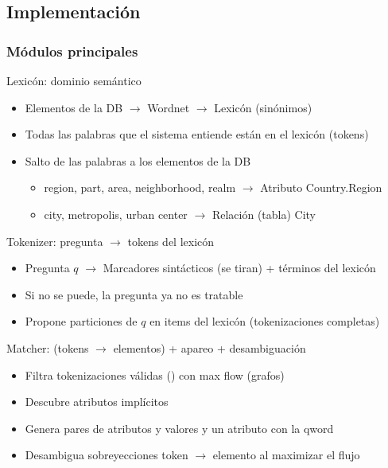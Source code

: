 \subsection{Implementación}


\begin{frame}[<+->]\fontsize{7.5pt}{7.2}\selectfont
  \frametitle{Módulos principales}
  \begin{block}{Lexicón: dominio semántico}
    \begin{itemize}
      \item Elementos de la DB $\rightarrow$ Wordnet $\rightarrow$ Lexicón (sinónimos)
      \item Todas las palabras que el sistema entiende están en el lexicón (tokens)
      \item Salto de las palabras a los elementos de la DB
      \begin{itemize}
        \item  \tiny{region, part, area, neighborhood, realm  $\rightarrow$ Atributo Country.Region  }
        \item  \tiny{city, metropolis, urban center  $\rightarrow$ Relación (tabla) City}
      \end{itemize}
    \end{itemize}
  \end{block}
  \begin{alertblock}{Tokenizer: pregunta $\rightarrow$ tokens del lexicón}
      \begin{itemize}
          \item Pregunta $q$ $\rightarrow$ Marcadores sintácticos (se tiran) + términos del lexicón
          \item Si no se puede, la pregunta ya no es tratable
          \item Propone particiones de $q$ en items del lexicón (tokenizaciones completas)
      \end{itemize}
  \end{alertblock}
  \begin{exampleblock}{Matcher: (tokens $\rightarrow$ elementos) + apareo + desambiguación}
      \begin{itemize}
          \item Filtra tokenizaciones válidas () con max flow (grafos)
          \item Descubre atributos implícitos
          \item Genera pares de atributos y valores y un atributo con la qword
          \item Desambigua sobreyecciones token $\rightarrow$ elemento al maximizar el flujo
    \end{itemize} 
  \end{exampleblock}
\end{frame}


